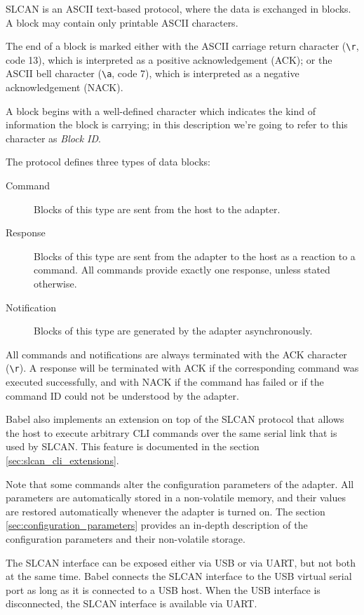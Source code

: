 \documentclass{zubaxdoc}
\begin{document}
SLCAN is an ASCII text-based protocol, where the data is exchanged in blocks.
A block may contain only printable ASCII characters.

The end of a block is marked either with the ASCII carriage return character (\verb|\r|, code 13),
which is interpreted as a positive acknowledgement (ACK);
or the ASCII bell character (\verb|\a|, code 7),
which is interpreted as a negative acknowledgement (NACK).

A block begins with a well-defined character which indicates the kind of information the block is carrying;
in this description we're going to refer to this character as \emph{Block ID}.

The protocol defines three types of data blocks:

\begin{description}
    \item[Command] Blocks of this type are sent from the host to the adapter.
    \item[Response] Blocks of this type are sent from the adapter to the host
          as a reaction to a command. All commands provide exactly one response, unless stated otherwise.
    \item[Notification] Blocks of this type are generated by the adapter asynchronously.
\end{description}

All commands and notifications are always terminated with the ACK character (\verb|\r|).
A response will be terminated with ACK if the corresponding command was executed successfully,
and with NACK if the command has failed or if the command ID could not be understood by the adapter.

Babel also implements an extension on top of the SLCAN protocol that allows the host to execute
arbitrary CLI commands over the same serial link that is used by SLCAN.
This feature is documented in the section \ref{sec:slcan_cli_extensions}.

Note that some commands alter the configuration parameters of the adapter.
All parameters are automatically stored in a non-volatile memory,
and their values are restored automatically whenever the adapter is turned on.
The section \ref{sec:configuration_parameters} provides an in-depth description of the configuration parameters
and their non-volatile storage.

The SLCAN interface can be exposed either via USB or via UART, but not both at the same time.
Babel connects the SLCAN interface to the USB virtual serial port as long as it is connected to a USB host.
When the USB interface is disconnected, the SLCAN interface is available via UART.
\end{document}
